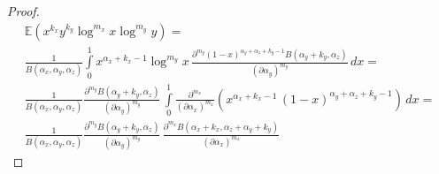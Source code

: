 \documentclass{article}
\begin{document}
\begin{theorem}
\begin{proof}
	\begin{multline*}
	\mathbb{E}(x^{k_x} y^{k_y} \log^{m_x} x \log^{m_y} y) = \\ \frac{1}{B(\alpha_x, \alpha_y, \alpha_z)} \int\limits_0^1 { x^{\alpha_x + k_x - 1} \log^{m_y}{x} \, \frac{\partial^{m_y} (1 - x)^{\alpha_y + \alpha_z + k_y - 1} B(\alpha_y + k_y, \alpha_z)}{(\partial \alpha_y)^{m_y}} \, dx } = \\ \frac{1}{B(\alpha_x, \alpha_y, \alpha_z)} \frac{\partial^{m_y} B(\alpha_y + k_y, \alpha_z)}{(\partial \alpha_y)^{m_y}} \, \int\limits_0^1 { \frac{\partial^{m_x}}{(\partial \alpha_x)^{m_x}} (x^{\alpha_x + k_x - 1} \, (1 - x)^{\alpha_y + \alpha_z + k_y - 1}) \, dx } = \\ \frac{1}{B(\alpha_x, \alpha_y, \alpha_z)} \frac{\partial^{m_y} B(\alpha_y + k_y, \alpha_z)}{(\partial \alpha_y)^{m_y}} \, \frac{\partial^{m_x} B(\alpha_x + k_x, \alpha_z + \alpha_y + k_y)}{(\partial \alpha_x)^{m_x}}
	\end{multline*}
\end{proof}
\end{theorem}
\end{document}
